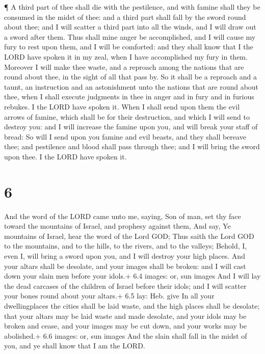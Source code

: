  ¶ A third part of thee shall die with the pestilence, and
with famine shall they be consumed in the midst of thee: and a third
part shall fall by the sword round about thee; and I will scatter a
third part into all the winds, and I will draw out a sword after them.
 Thus shall mine anger be accomplished, and I will cause my
fury to rest upon them, and I will be comforted: and they shall know
that I the LORD have spoken it in my zeal, when I have accomplished my
fury in them.  Moreover I will make thee waste, and a
reproach among the nations that are round about thee, in the sight of
all that pass by.  So it shall be a reproach and a taunt,
an instruction and an astonishment unto the nations that are round about
thee, when I shall execute judgments in thee in anger and in fury and in
furious rebukes. I the LORD have spoken it.  When I shall
send upon them the evil arrows of famine, which shall be for their
destruction, and which I will send to destroy you: and I will increase
the famine upon you, and will break your staff of bread: 
So will I send upon you famine and evil beasts, and they shall bereave
thee; and pestilence and blood shall pass through thee; and I will bring
the sword upon thee. I the LORD have spoken it.

\hypertarget{section-5}{%
\section{6}\label{section-5}}

 And the word of the LORD came unto me, saying, 
Son of man, set thy face toward the mountains of Israel, and prophesy
against them,  And say, Ye mountains of Israel, hear the
word of the Lord GOD; Thus saith the Lord GOD to the mountains, and to
the hills, to the rivers, and to the valleys; Behold, I, even I, will
bring a sword upon you, and I will destroy your high places.
 And your altars shall be desolate, and your images shall be
broken: and I will cast down your slain men before your idols.+ 6.4
images: or, sun images  And I will lay the dead carcases of
the children of Israel before their idols; and I will scatter your bones
round about your altars.+ 6.5 lay: Heb. give  In all your
dwellingplaces the cities shall be laid waste, and the high places shall
be desolate; that your altars may be laid waste and made desolate, and
your idols may be broken and cease, and your images may be cut down, and
your works may be abolished.+ 6.6 images: or, sun images 
And the slain shall fall in the midst of you, and ye shall know that I
am the LORD.

